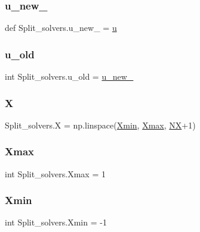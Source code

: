 \subsubsection{\texorpdfstring{u\+\_\+new\+\_}{u\_new\_1}}
{\footnotesize\ttfamily def Split\+\_\+solvers.\+u\+\_\+new\+\_ = \hyperlink{namespaceSplit__solvers_abe87b0440e65cc15867b535fe5594457}{u}}

\mbox{\label{namespaceSplit__solvers_ab5a06ffd8881f993be924d175cf33bf0}} 
\subsubsection{\texorpdfstring{u\+\_\+old}{u\_old}}
{\footnotesize\ttfamily int Split\+\_\+solvers.\+u\+\_\+old = \hyperlink{namespaceSplit__solvers_ad561a5b47428860b09231ef32d981065}{u\+\_\+new\+\_}}

\mbox{\label{namespaceSplit__solvers_a1884fc9efd3f156e55b75a45f19d7244}} 
\subsubsection{\texorpdfstring{X}{X}}
{\footnotesize\ttfamily Split\+\_\+solvers.\+X = np.\+linspace(\hyperlink{namespaceSplit__solvers_abe1cb9889c38d9038ab77c312a857ae5}{Xmin}, \hyperlink{namespaceSplit__solvers_a3a9b8c9973a6efe018e8b1dd5c13a896}{Xmax}, \hyperlink{namespaceSplit__solvers_a6f5cab1ea541e5ae5d4ae5a0d62ab100}{NX}+1)}

\mbox{\label{namespaceSplit__solvers_a3a9b8c9973a6efe018e8b1dd5c13a896}} 
\subsubsection{\texorpdfstring{Xmax}{Xmax}}
{\footnotesize\ttfamily int Split\+\_\+solvers.\+Xmax = 1}

\mbox{\label{namespaceSplit__solvers_abe1cb9889c38d9038ab77c312a857ae5}} 
\subsubsection{\texorpdfstring{Xmin}{Xmin}}
{\footnotesize\ttfamily int Split\+\_\+solvers.\+Xmin = -\/1}

